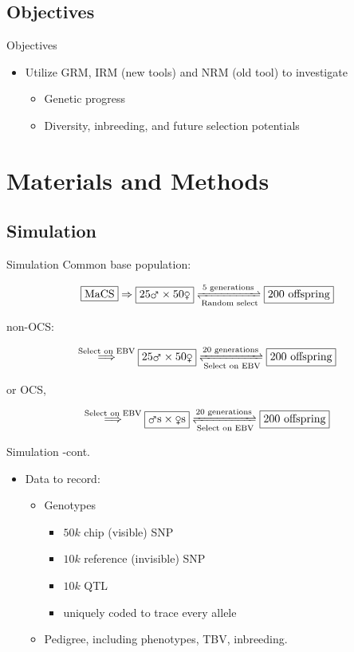 \documentclass{beamer}
\begin{document}
\subsection{Objectives}
\begin{frame}{Objectives}
  \begin{itemize}
  \item Utilize GRM, IRM (new tools) and NRM (old tool) to investigate
    \begin{itemize}
    \item Genetic progress
    \item Diversity, inbreeding, and future selection potentials
    \end{itemize}
  \end{itemize}
\end{frame}

\section{Materials and Methods}

\subsection{Simulation}
\begin{frame}{Simulation}
  Common base population:

  $$\boxed{\text{MaCS}}\Rightarrow\boxed{\text{25\mars}\times\text{50\female}}\xrightleftharpoons[\text{Random select}]{\text{5 generations}}\boxed{\text{200 offspring}}$$

  non-OCS:

  $$\overset{\text{Select on EBV}}\Longrightarrow\boxed{\text{25\mars}\times\text{50\female}}\xrightleftharpoons[\text{Select on EBV}]{\text{20 generations}}\boxed{\text{200 offspring}}$$

  or OCS,

  $$\overset{\text{Select on EBV}}\Longrightarrow\boxed{\text{\mars s}\times\text{\female s}}\xrightleftharpoons[\text{Select on EBV}]{\text{20 generations}}\boxed{\text{200 offspring}}$$
\end{frame}

\begin{frame}{Simulation -cont.}
  \begin{itemize}
  \item Data to record:
    \begin{itemize}
    \item Genotypes
      \begin{itemize}
      \item $50k$ chip (visible) SNP
      \item $10k$ reference (invisible) SNP
      \item $10k$ QTL
      \item uniquely coded to trace every allele
      \end{itemize}
    \item Pedigree, including phenotypes, TBV, inbreeding.
    \end{itemize}
  \end{itemize}
\end{frame}
\end{document}
